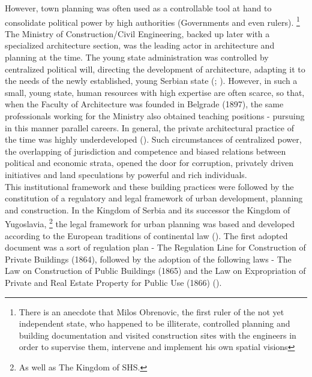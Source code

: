 \documentclass[11pt]{report}
\begin{document}
{{{{However, town planning was often used as a controllable tool at hand to consolidate political power by high authorities (Governments and even rulers). 
\footnote{There is an anecdote that Milos Obrenovic, the first ruler of the not yet independent state, who happened to be illiterate, controlled planning and building documentation and visited construction sites with the
engineers in order to supervise them, intervene and implement his own spatial visions}
The Ministry of Construction/Civil Engineering, backed up later with a specialized architecture section, was the leading actor in architecture and planning at the time. The young state administration was controlled by centralized political will, directing the development of architecture, adapting it to the needs of the newly established, young Serbian state (\href{Maksimovi}{\citealt{maksimovic_idejni_1978}}; \href{ref}{\citealt{nedovicbudic_waves_2006}}).
However, in such a small, young state, human resources with high expertise are often  scarce,  so  that,  when  the  Faculty  of  Architecture  was  founded  in  Belgrade  (1897), the  same  professionals  working  for  the  Ministry  also  obtained  teaching  positions  - pursuing in this manner parallel careers. In general, the private architectural practice of the time was highly underdeveloped (\href{Mladjenovic}{\citealt{mladjenovic_novija_2010}}). Such circumstances of centralized power, the overlapping of jurisdiction and competence and biased relations between political and economic strata, opened the door for corruption, privately driven initiatives and land speculations by powerful and rich individuals.
\\

This institutional framework and these building practices were followed by the constitution of a regulatory and legal framework of urban development, planning and construction. In the Kingdom of Serbia and its successor the Kingdom of Yugoslavia,
\footnote{As well as The Kingdom of SHS.}
the legal framework for urban planning was based and developed according to the European traditions of continental law (\href{Zekovic}{\citealt{zekovic_historical_2016}}).
The first adopted document was a sort of regulation plan - The Regulation Line for Construction of Private Buildings (1864), followed by the adoption of the following laws - The Law on Construction of Public Buildings (1865) and the Law on Expropriation of Private and Real Estate Property for Public Use (1866) (\href{Nedovic}{\citealt{nedovicbudic_waves_2006}}).
\\

}}}}
\end{document}
